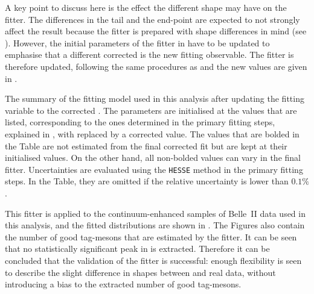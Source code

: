 A key point to discuss here is the effect the different \Mbc shape may have on the \Mbc fitter.
The differences in the tail and the end-point are expected to not strongly affect the result because the \Mbc fitter is prepared with shape differences in mind (see ).
However, the initial parameters of the \Mbc fitter in  have to be updated to emphasise that a different corrected \Mbc is the new fitting observable.
The \Mbc fitter is therefore updated, following the same procedures as  and the new values are given in .
\begin{table}[hbtp!]
    \centering
    \caption{\label{tab:fitting_init_params_updated} The summary of the \Mbc fitting model used in this analysis after updating the fitting variable to the corrected \Mbc.
    The parameters are initialised at the values that are listed, corresponding to the ones determined in the primary fitting steps, explained in , with \Mbc replaced by a corrected \Mbc value.
    The values that are bolded in the Table are not estimated from the final corrected \Mbc fit but are kept at their initialised values.
    On the other hand, all non-bolded values can vary in the final fitter.
    Uncertainties are evaluated using the \texttt{HESSE} method in the primary fitting steps.
    In the Table, they are omitted if the relative uncertainty is lower than $0.1\%$.
    }
    
\end{table}

This fitter is applied to the continuum-enhanced samples of Belle~II data used in this analysis,
and the  fitted \Mbc distributions are shown in .
The Figures also contain the number of good tag-\B mesons that are estimated by the fitter.
It can be seen that no statistically significant peak in \Mbc is extracted.
Therefore it can be concluded that the validation of the \Mbc fitter is successful: enough flexibility is seen
to describe the slight difference in \Mbc shapes between \MC and real data, without introducing a bias to the extracted number of good tag-\B mesons.



